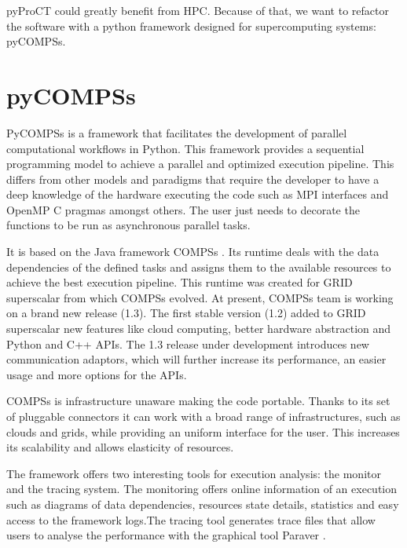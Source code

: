 pyProCT could greatly benefit from HPC. Because of that, we want to refactor the software with a python framework designed for supercomputing systems: pyCOMPSs.


\section{pyCOMPSs}


PyCOMPSs \cite{Tejedor2015} is a framework that facilitates the development of parallel computational workflows in Python. This framework provides a sequential programming model to achieve a parallel and optimized execution pipeline. This differs from other models and paradigms that require the developer to have a deep knowledge of the hardware executing the code such as MPI interfaces and OpenMP C pragmas amongst others. The user just needs to decorate the functions to be run as asynchronous parallel tasks. 

It is based on the Java framework COMPSs \cite{Lordan2013}. Its runtime deals with the data dependencies of the defined tasks and assigns them to the available resources to achieve the best execution pipeline. This runtime was created for GRID superscalar \cite{Badia2003} from which COMPSs evolved. At present, COMPSs team is working on a brand new release (1.3). The first stable version (1.2) added to GRID superscalar new features like cloud computing, better hardware abstraction and Python and C++ APIs. The 1.3 release under development introduces new communication adaptors, which will further increase its performance, an easier usage and more options for the APIs. 

COMPSs is infrastructure unaware making the code portable. Thanks to its set of pluggable connectors it can work with a broad range of infrastructures, such as clouds\cite{lezzi2012enabling} and grids, while providing an uniform interface for the user. This increases its scalability and allows elasticity of resources.

The framework offers two interesting tools for execution analysis: the monitor and the tracing system. The monitoring offers online information of an execution such as diagrams of data dependencies, resources state details, statistics and easy access to the framework logs.The tracing tool generates trace files that allow users to analyse the performance with the graphical tool Paraver \cite{Pillet1991}.

